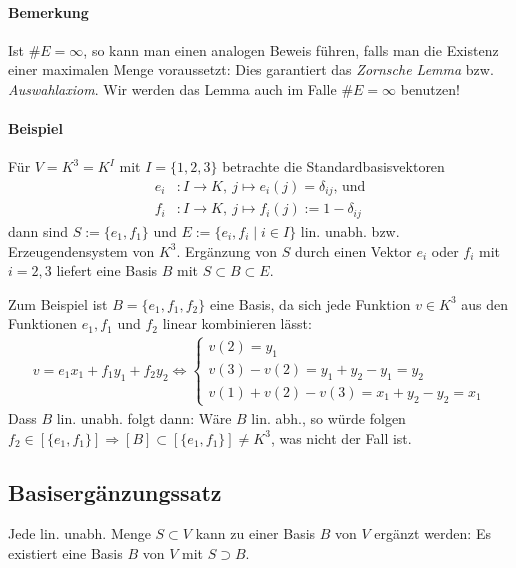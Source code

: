  	\paragraph{Bemerkung}
 		Ist $\#E = \infty$, so kann man einen analogen Beweis führen, falls man die Existenz einer maximalen Menge voraussetzt: Dies garantiert das \emph{Zornsche Lemma} bzw. \emph{Auswahlaxiom}.
 		Wir werden das Lemma auch im Falle $\#E = \infty$ benutzen!

 	\paragraph{Beispiel}
 		Für $V=K^3=K^I$ mit $I=\{1,2,3\}$ betrachte die Standardbasisvektoren
 		\begin{align*}
 			e_i & :I\to K,\ j\mapsto e_i(j) = \delta_{ij}\text{, und} \\
 			f_i & : I\to K,\ j\mapsto f_i(j):= 1-\delta_{ij}
 		\end{align*}
 		dann sind $S:= \{e_1,f_1\}$ und $E:= \{e_i,f_i\mid i\in I\}$ lin. unabh. bzw. Erzeugendensystem von $K^3$. Ergänzung von $S$ durch einen Vektor $e_i$ oder $f_i$ mit $i = 2,3$ liefert eine Basis $B$ mit $S\subset B\subset E$.

 		Zum Beispiel ist $B=\{e_1,f_1,f_2\}$ eine Basis, da sich jede Funktion $v\in K^3$ aus den Funktionen $e_1,f_1$ und $f_2$ linear kombinieren lässt:
 		\begin{gather*}
 			v=e_1x_1+f_1y_1 + f_2y_2\Leftrightarrow \left\{
 			\begin{array}{l}
 				v(2)=y_1                                   \\
 				v(3) - v(2) = y_1 + y_2 - y_1 = y_2        \\
 				v(1) + v(2) - v(3) = x_1 + y_2 - y_2 = x_1
 			\end{array}
 			\right.
 		\end{gather*}
 		Dass $B$ lin. unabh. folgt dann: Wäre $B$ lin. abh., so würde folgen $f_2\in [\{e_1,f_1\}]\Rightarrow [B] \subset [\{e_1,f_1\}] \neq K^3$, was nicht der Fall ist.

 \subsection{Basisergänzungssatz}
 	\begin{Satz}[Basisergänzungssatz]
 		Jede lin. unabh. Menge $S\subset V$ kann zu einer Basis $B$ von $V$ ergänzt werden: Es existiert eine Basis $B$ von $V$ mit $S\supset B$.
 	\end{Satz}

